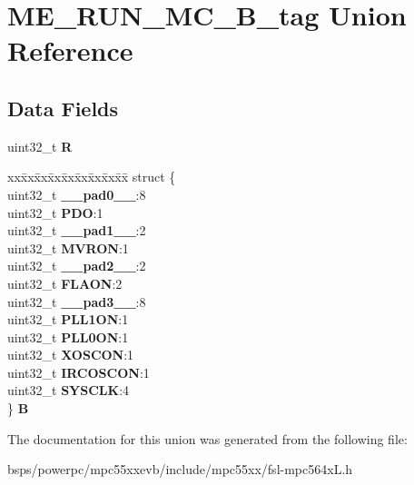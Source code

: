 \hypertarget{unionME__RUN__MC__32B__tag}{}\section{M\+E\+\_\+\+R\+U\+N\+\_\+\+M\+C\+\_\+B\+\_\+tag Union Reference}
\label{unionME__RUN__MC__32B__tag}
\subsection*{Data Fields}
\begin{DoxyCompactItemize}
\item 
\mbox{\label{unionME__RUN__MC__32B__tag_abda35e5a6e62331f7ef694995b66ff50}} 
uint32\+\_\+t {\bfseries R}
\item 
\mbox{\label{unionME__RUN__MC__32B__tag_a5eef0110d0a27aed448bbc44b9d19b24}} 
\begin{tabbing}
xx\=xx\=xx\=xx\=xx\=xx\=xx\=xx\=xx\=\kill
struct \{\\
\>uint32\_t {\bfseries \_\_pad0\_\_}:8\\
\>uint32\_t {\bfseries PDO}:1\\
\>uint32\_t {\bfseries \_\_pad1\_\_}:2\\
\>uint32\_t {\bfseries MVRON}:1\\
\>uint32\_t {\bfseries \_\_pad2\_\_}:2\\
\>uint32\_t {\bfseries FLAON}:2\\
\>uint32\_t {\bfseries \_\_pad3\_\_}:8\\
\>uint32\_t {\bfseries PLL1ON}:1\\
\>uint32\_t {\bfseries PLL0ON}:1\\
\>uint32\_t {\bfseries XOSCON}:1\\
\>uint32\_t {\bfseries IRCOSCON}:1\\
\>uint32\_t {\bfseries SYSCLK}:4\\
\} {\bfseries B}\\

\end{tabbing}\end{DoxyCompactItemize}


The documentation for this union was generated from the following file\+:\begin{DoxyCompactItemize}
\item 
bsps/powerpc/mpc55xxevb/include/mpc55xx/fsl-\/mpc564x\+L.\+h\end{DoxyCompactItemize}

